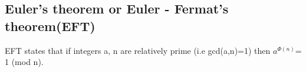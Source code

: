 \documentclass{article}
\begin{document}
\subsection{Euler's theorem or Euler - Fermat's theorem(EFT)}
EFT states that if integers a, n are relatively prime (i.e gcd(a,n)=1) then $a^{\Phi(n)}$= 1 (mod n).




    
    
    





	 
	   
	
\end{document}

